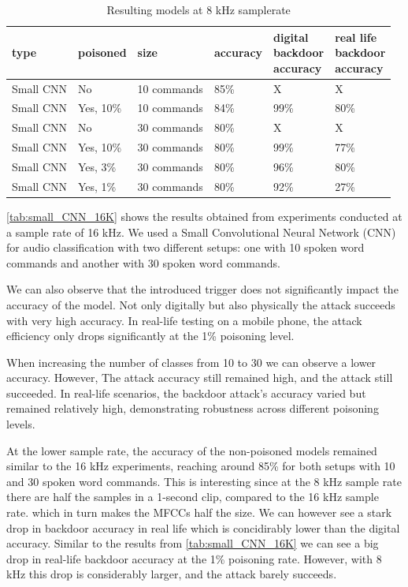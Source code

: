 \documentclass{report}
\theoremstyle{definition}
\theoremstyle{remark}
\begin{document}
\begin{table}[!hbt]
\centering
\begin{tabular}{|l|l|l|l|l|l|}
\hline
type & poisoned & size & accuracy &  \thead{digital \\ backdoor \\ accuracy} & \thead{real life \\ backdoor \\ accuracy} \\ \hline
Small CNN & No  &  10 commands  &  85\% & X & X \\ \hline
Small CNN & Yes, 10\%  &  10 commands  & 84\% &  99\% & 80\%  \\ \hline
Small CNN & No  &  30 commands  &  80\% & X &  X   \\ \hline
Small CNN & Yes, 10\%  &  30 commands  &  80\% & 99\% &  77\%   \\ \hline
Small CNN & Yes, 3\%  &  30 commands  &  80\%  & 96\% &  80\%   \\ \hline
Small CNN & Yes, 1\%  &  30 commands  &  80\%  & 92\% &  27\%   \\ \hline

\end{tabular}
\caption{Resulting models at 8 kHz samplerate}
\label{tab:small_CNN_8K}
\end{table}

\autoref{tab:small_CNN_16K} shows the results obtained from experiments conducted at a sample rate of 16 kHz. We used a Small Convolutional Neural Network (CNN) for audio classification with two different setups: one with 10 spoken word commands and another with 30 spoken word commands. 

We can also observe that the introduced trigger does not significantly impact the accuracy of the model. Not only digitally but also physically the attack succeeds with very high accuracy.  In real-life testing on a mobile phone, the attack efficiency only drops significantly at the 1\% poisoning level.

When increasing the number of classes from 10 to 30 we can observe a lower accuracy. However, The attack accuracy still remained high, and the attack still succeeded. In real-life scenarios, the backdoor attack's accuracy varied but remained relatively high, demonstrating robustness across different poisoning levels.

At the lower sample rate, the accuracy of the non-poisoned models remained similar to the 16 kHz experiments, reaching around 85\% for both setups with 10 and 30 spoken word commands. This is interesting since at the 8 kHz sample rate there are half the samples in a 1-second clip, compared to the 16 kHz sample rate. which in turn makes the MFCCs half the size. We can however see a stark drop in backdoor accuracy in real life which is concidirably lower than the digital accuracy. Similar to the results from \autoref{tab:small_CNN_16K} we can see a big drop in real-life backdoor accuracy at the 1\% poisoning rate. However, with 8 kHz this drop is considerably larger, and the attack barely succeeds.
\end{document}
